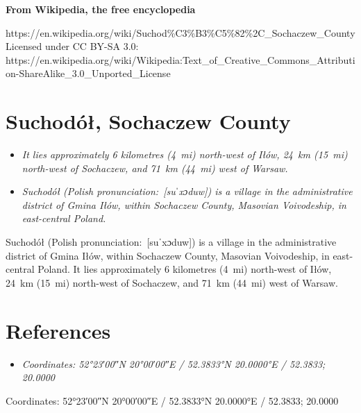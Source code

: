 \textbf{From Wikipedia, the free encyclopedia}

https://en.wikipedia.org/wiki/Suchod\%C3\%B3\%C5\%82\%2C\_Sochaczew\_County\\
Licensed under CC BY-SA 3.0:\\
https://en.wikipedia.org/wiki/Wikipedia:Text\_of\_Creative\_Commons\_Attribution-ShareAlike\_3.0\_Unported\_License

\section{Suchodół, Sochaczew
County}\label{suchoduxf3ux142-sochaczew-county}

\begin{itemize}
\item
  \emph{It lies approximately 6 kilometres (4~mi) north-west of Iłów,
  24~km (15~mi) north-west of Sochaczew, and 71~km (44~mi) west of
  Warsaw.}
\item
  \emph{Suchodół (Polish pronunciation:~{[}suˈxɔduw{]}) is a village in
  the administrative district of Gmina Iłów, within Sochaczew County,
  Masovian Voivodeship, in east-central Poland.}
\end{itemize}

Suchodół (Polish pronunciation:~{[}suˈxɔduw{]}) is a village in the
administrative district of Gmina Iłów, within Sochaczew County, Masovian
Voivodeship, in east-central Poland. It lies approximately 6 kilometres
(4~mi) north-west of Iłów, 24~km (15~mi) north-west of Sochaczew, and
71~km (44~mi) west of Warsaw.

\section{References}\label{references}

\begin{itemize}
\item
  \emph{Coordinates: 52°23′00″N 20°00′00″E﻿ / ﻿52.3833°N 20.0000°E﻿ /
  52.3833; 20.0000}
\end{itemize}

Coordinates: 52°23′00″N 20°00′00″E﻿ / ﻿52.3833°N 20.0000°E﻿ / 52.3833;
20.0000
